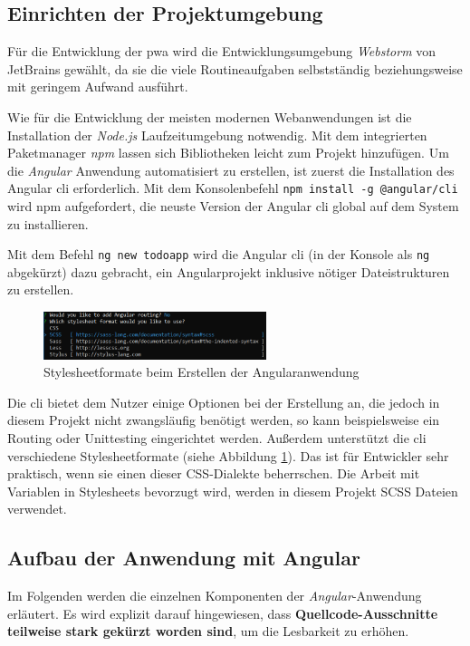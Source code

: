 \subsection{Einrichten der Projektumgebung}
Für die Entwicklung der \ac{pwa} wird die Entwicklungsumgebung \textit{Webstorm} von JetBrains gewählt, da sie die viele Routineaufgaben selbstständig beziehungsweise mit geringem Aufwand ausführt.

Wie für die Entwicklung der meisten modernen Webanwendungen ist die Installation der \textit{Node.js} Laufzeitumgebung notwendig. Mit dem integrierten Paketmanager \textit{npm} lassen sich Bibliotheken leicht zum Projekt hinzufügen.
Um die \textit{Angular} Anwendung automatisiert zu erstellen, ist zuerst die Installation des Angular \acf{cli} erforderlich. Mit dem Konsolenbefehl \texttt{npm install -g @angular/cli} wird npm aufgefordert, die neuste Version der Angular \ac{cli} global auf dem System zu installieren.


Mit dem Befehl \texttt{ng new todoapp} wird die Angular \ac{cli} (in der Konsole als \texttt{ng} abgekürzt) dazu gebracht, ein Angularprojekt inklusive nötiger Dateistrukturen zu erstellen.

\begin{figure}[h!]
	\centering
	\includegraphics[width=0.58\textwidth]{img/angular_cli_css.PNG}
	\caption{Stylesheetformate beim Erstellen der Angularanwendung}
	\label{fig:stylesheet_formate_cli}
\end{figure}

Die \ac{cli} bietet dem Nutzer einige Optionen bei der Erstellung an, die jedoch in diesem Projekt nicht zwangsläufig benötigt werden, so kann beispielsweise ein Routing oder Unittesting eingerichtet werden.
Außerdem unterstützt die \ac{cli} verschiedene Stylesheetformate (siehe Abbildung \ref{fig:stylesheet_formate_cli}). Das ist für Entwickler sehr praktisch, wenn sie einen dieser CSS-Dialekte beherrschen. Die Arbeit mit Variablen in Stylesheets bevorzugt wird, werden in diesem Projekt SCSS Dateien verwendet.


\subsection{Aufbau der Anwendung mit Angular}

Im Folgenden werden die einzelnen Komponenten der \textit{Angular}-Anwendung erläutert. Es wird explizit darauf hingewiesen, dass \textbf{Quellcode-Ausschnitte teilweise stark gekürzt worden sind}, um die Lesbarkeit zu erhöhen.

